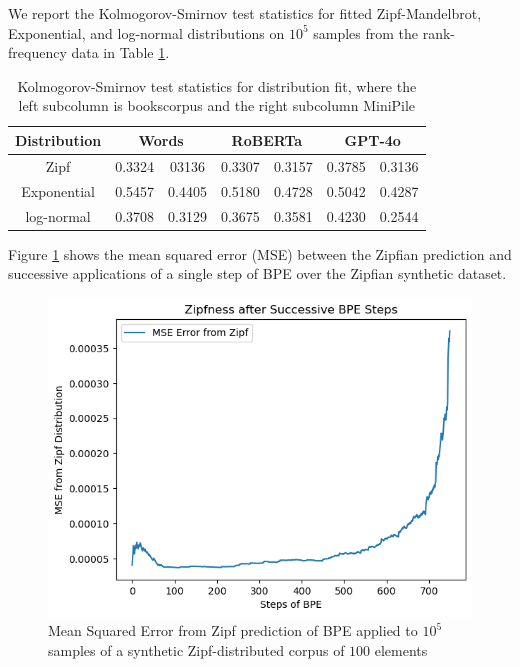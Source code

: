 \documentclass[11pt]{article}
\begin{document}
We report the Kolmogorov-Smirnov test statistics for fitted Zipf-Mandelbrot, Exponential, and log-normal distributions on $10^5$ samples from the rank-frequency data in Table \ref{tbl:kstest}. 

\begin{table}
    \centering
    \begin{tabular}{|c|c|c|c|c|c|c|}
        \hline
        \textbf{Distribution} & \multicolumn{2}{c|}{\textbf{Words}} & \multicolumn{2}{c|}{\textbf{RoBERTa}} & \multicolumn{2}{c|}{\textbf{GPT-4o}}  \\
        \hline
        Zipf & 0.3324 & 03136 & 0.3307 & 0.3157 & 0.3785 & 0.3136 \\
        \hline
        Exponential & 0.5457 & 0.4405 & 0.5180 & 0.4728 & 0.5042 & 0.4287 \\
        \hline
        log-normal & 0.3708 & 0.3129 & 0.3675 & 0.3581 & 0.4230 & 0.2544 \\
        \hline
    \end{tabular}
    \caption{Kolmogorov-Smirnov test statistics for distribution fit, where the left subcolumn is bookscorpus and the right subcolumn MiniPile}
    \label{tbl:kstest}
\end{table}

Figure \ref{fig:theoryexperiments} shows the mean squared error (MSE) between the Zipfian prediction and successive applications of a single step of BPE over the Zipfian synthetic dataset. 

\begin{figure}[t]
  \includegraphics[width=\columnwidth]{../visualizations/zipfnessovertime.png}
  \caption{Mean Squared Error from Zipf prediction of BPE applied to $10^5$ samples of a synthetic Zipf-distributed corpus of $100$ elements}
  \label{fig:theoryexperiments}
\end{figure}
\end{document}
